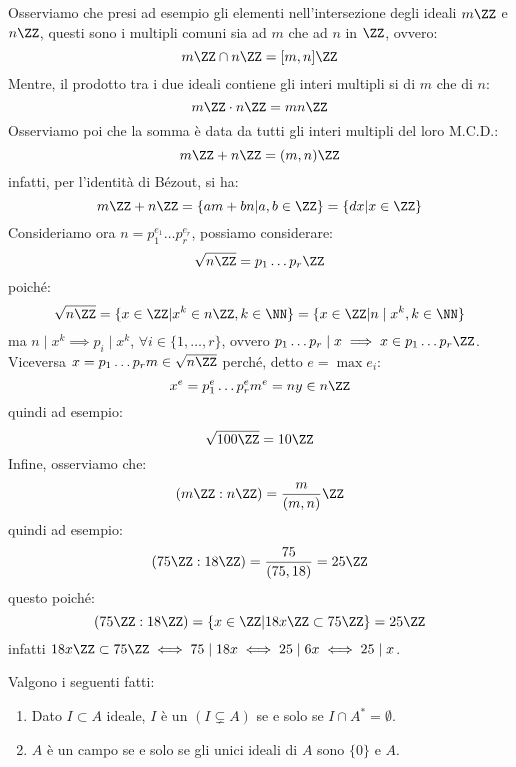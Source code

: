\documentclass[11pt]{scrartcl}
\begin{document}
\begin{example}
    Osserviamo che presi ad esempio gli elementi nell'intersezione degli ideali $m\ZZ$ e $n\ZZ$, questi sono i multipli comuni sia ad $m$ che ad $n$ in $\ZZ$, ovvero:
        \[ m\ZZ \cap n\ZZ = [m,n]\ZZ
            \]
    Mentre, il prodotto tra i due ideali contiene gli interi multipli si di $m$ che di $n$:
        \[ m\ZZ \cdot n\ZZ = mn\ZZ
            \]
    Osserviamo poi che la somma è data da tutti gli interi multipli del loro M.C.D.:
        \[ m\ZZ + n\ZZ = (m,n)\ZZ
            \]
    infatti, per l'identità di Bézout, si ha:
        \[ m\ZZ + n\ZZ = \{am + bn | a,b \in \ZZ\} = \{dx | x \in \ZZ\}
            \]
    Consideriamo ora $n = p_1^{e_1} \ldots p_r^{e_r}$, possiamo considerare:
        \[ \sqrt{n\ZZ} = p_1 \ldots p_r\ZZ
            \]
    poiché:
        \[ \sqrt{n\ZZ} = \{x \in \ZZ | x^k \in n\ZZ, k \in \NN\} = \{x \in \ZZ | n \mid x^k, k \in \NN\}
            \]
    ma $n \mid x^k \implies p_i \mid x^k$, $\forall i \in \{1,\ldots,r\}$, ovvero $p_1 \ldots p_r \mid x \implies x \in p_1\ldots p_r\ZZ$.
    Viceversa $x = p_1 \ldots p_r m \in \sqrt{n\ZZ}$ perché, detto $e = \max e_i$:
        \[ x^e = p_1^e \ldots p_r^e m^e = ny \in n\ZZ
            \]
    quindi ad esempio:
        \[ \sqrt{100\ZZ} = 10\ZZ
            \]
    Infine, osserviamo che:
        \[ (m\ZZ : n\ZZ) = \frac{m}{(m,n)}\ZZ
            \]
    quindi ad esempio:
        \[ (75\ZZ : 18\ZZ) = \frac{75}{(75,18)} = 25\ZZ
            \]
    questo poiché:
        \[ (75\ZZ : 18\ZZ) = \{x \in \ZZ | 18x \ZZ \subset 75\ZZ\} = 25\ZZ
            \]
    infatti $18x \ZZ \subset 75\ZZ \iff 75 \mid 18x \iff 25 \mid 6x \iff 25 \mid x$.
\end{example}

\newpage
\begin{proposition}
\label{2.26}
Valgono i seguenti fatti:
\begin{enumerate}[(1)]
    \item Dato $I \subset A$ ideale, $I$ è un  $(I \subsetneq A)$ se e solo se $I \cap A^* = \emptyset$.
    \item $A$ è un campo se e solo se gli unici ideali di $A$ sono $\{0\}$ e $A$.
\end{enumerate}
\end{proposition}
\end{document}
